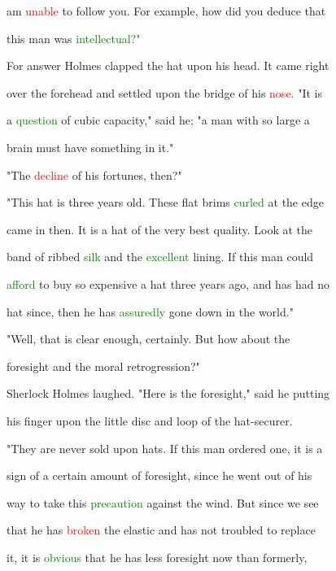  am \textcolor{red}{unable} to follow you. For example, how did you deduce that

 this man was \textcolor{green}{intellectual?"}



 For answer Holmes clapped the hat upon his head. It came right

 over the forehead and settled upon the bridge of his \textcolor{red}{nose.} "It is

 a \textcolor{green}{question} of cubic capacity," said he; "a man with so large a

 brain must have something in it."



 "The \textcolor{red}{decline} of his \textcolor{BurntOrange}{fortunes,} then?"



 "This hat is three years old. These flat brims \textcolor{green}{curled} at the edge

 came in then. It is a hat of the very best quality. Look at the

 band of ribbed \textcolor{green}{silk} and the \textcolor{green}{excellent} lining. If this man could

 \textcolor{green}{afford} to buy so expensive a hat three years ago, and has had no

 hat since, then he has \textcolor{green}{assuredly} gone down in the world."



 "Well, that is clear enough, certainly. But how about the

 \textcolor{BurntOrange}{foresight} and the \textcolor{BurntOrange}{moral} retrogression?"



 Sherlock Holmes \textcolor{BurntOrange}{laughed.} "Here is the \textcolor{BurntOrange}{foresight,"} said he putting

 his finger upon the little disc and loop of the hat-securer.

 "They are never sold upon hats. If this man ordered one, it is a

 sign of a certain amount of \textcolor{BurntOrange}{foresight,} since he went out of his

 way to take this \textcolor{green}{precaution} against the wind. But since we see

 that he has \textcolor{red}{broken} the elastic and has not troubled to replace

 it, it is \textcolor{green}{obvious} that he has less \textcolor{BurntOrange}{foresight} now than formerly,

